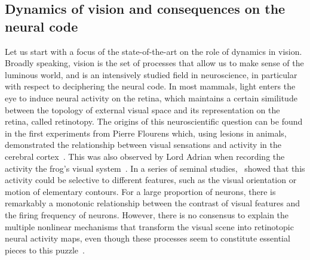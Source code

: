 \documentclass[brainsci, %
               review,submit,pdftex,moreauthors
               ]{Definitions/mdpi}
\begin{document}
\subsection{Dynamics of vision and consequences on the neural code}%
%
Let us start with a focus of the state-of-the-art on the role of dynamics in vision. Broadly speaking, vision is the set of processes that allow us to make sense of the luminous world, and is an intensively studied field in neuroscience, in particular with respect to deciphering the neural code. In most mammals, light enters the eye to induce neural activity on the retina, which maintains a certain similitude between the topology of external visual space and its representation on the retina, called retinotopy. The origins of this neuroscientific question can be found in the first experiments from Pierre Flourens which, using lesions in animals, demonstrated the relationship between visual sensations and activity in the cerebral cortex~\citep{flourens_recherches_1842,pearce_marie-jean-pierre_2009}. This was also observed by Lord Adrian when recording the activity the frog's visual system~\citep{adrian_impulses_1926}. In a series of seminal studies,~\citet{hubel_receptive_1968} showed that this activity could be selective to different features, such as the visual orientation or motion of elementary contours. For a large proportion of neurons, there is remarkably a monotonic relationship between the contrast of visual features and the firing frequency of neurons. However, there is no consensus to explain the multiple nonlinear mechanisms that transform the visual scene into retinotopic neural activity maps, even though these processes seem to constitute essential pieces to this puzzle~\citep{carandini_normalization_2012}. 
\end{document}
